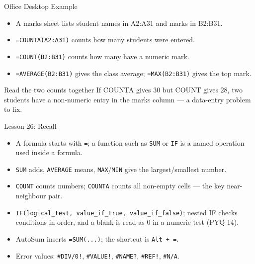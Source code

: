 \documentclass[aspectratio=169]{beamer}
\begin{document}
\begin{frame}{Office Desktop Example}
  \begin{itemize}
    \item A marks sheet lists student names in A2:A31 and marks in B2:B31.
    \item \texttt{=COUNTA(A2:A31)} counts how many students were entered.
    \item \texttt{=COUNT(B2:B31)} counts how many have a numeric mark.
    \item \texttt{=AVERAGE(B2:B31)} gives the class average;
      \texttt{=MAX(B2:B31)} gives the top mark.
  \end{itemize}
  \begin{exampleblock}{Read the two counts together}
    If COUNTA gives 30 but COUNT gives 28, two students have a non-numeric
    entry in the marks column --- a data-entry problem to fix.
  \end{exampleblock}
\end{frame}

\begin{frame}{Lesson 26: Recall}
  \begin{itemize}
    \item A formula starts with \texttt{=}; a function such as \texttt{SUM}
      or \texttt{IF} is a named operation used inside a formula.
    \item \texttt{SUM} adds, \texttt{AVERAGE} means, \texttt{MAX}/\texttt{MIN}
      give the largest/smallest number.
    \item \texttt{COUNT} counts numbers; \texttt{COUNTA} counts all
      non-empty cells --- the key near-neighbour pair.
    \item \texttt{IF(logical\_test, value\_if\_true, value\_if\_false)};
      nested IF checks conditions in order, and a blank is read as 0 in a
      numeric test (PYQ-14).
    \item AutoSum inserts \texttt{=SUM(...)}; the shortcut is \texttt{Alt + =}.
    \item Error values: \texttt{\#DIV/0!}, \texttt{\#VALUE!},
      \texttt{\#NAME?}, \texttt{\#REF!}, \texttt{\#N/A}.
  \end{itemize}
\end{frame}
\end{document}
